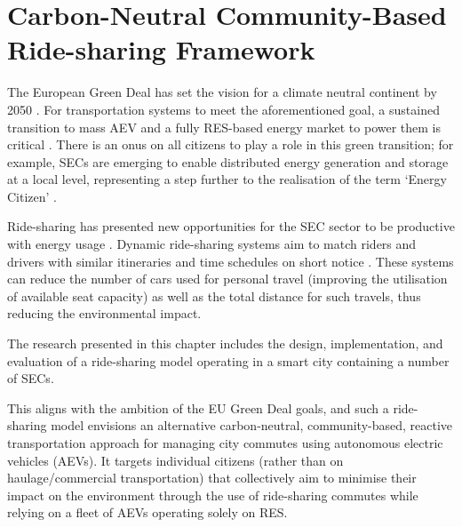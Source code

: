 \chapter{Carbon-Neutral Community-Based Ride-sharing Framework}
\label{chapter3}

The European Green Deal has set the vision for a climate neutral continent by 2050 \cite{greendeal}.  For transportation systems to meet the aforementioned goal, a sustained transition to mass AEV and a fully RES-based energy market to power them is critical \cite{evplanning}. There is an onus on all citizens to play a role in this green transition; for example,  SECs are emerging to enable distributed energy generation and storage at a local level, representing a step further to the realisation of the term `Energy Citizen' \cite{energydatamanagement}.

Ride-sharing has presented new opportunities for the SEC sector to be productive with energy usage \cite{optimiserideshare}. Dynamic ride-sharing systems aim to match riders and drivers with similar itineraries and time schedules on short notice \cite{soa_rideshare}.
These systems can reduce the number of cars used for personal travel (improving the utilisation of available seat capacity) as well as the total distance for such travels, thus reducing the environmental impact.

The research presented in this chapter includes the design, implementation, and evaluation of a ride-sharing model operating in a smart city containing a number of SECs.

This aligns with the ambition of the EU Green Deal goals, and such a ride-sharing model envisions an alternative carbon-neutral,  community-based,  reactive transportation approach for managing city commutes using autonomous electric vehicles (AEVs).   
It targets  individual citizens (rather than on haulage/commercial transportation) that collectively aim to minimise their impact on the environment through the use of ride-sharing commutes while relying on a fleet of AEVs operating solely on RES. 

